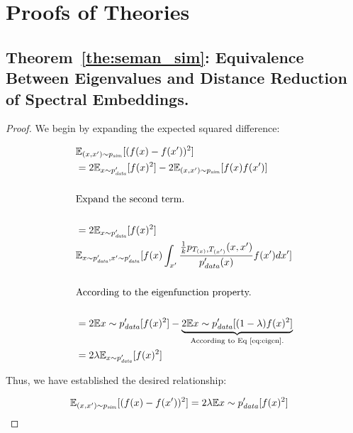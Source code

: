 \section{Proofs of Theories}

\subsection{\textbf{Theorem}~\ref{the:seman_sim}: Equivalence Between Eigenvalues and Distance Reduction of Spectral Embeddings.}\label{proof:eq}


\begin{proof}
    
We begin by expanding the expected squared difference:

\begin{equation}
\begin{aligned}
& \mathbb{E}_{(x, x^\prime)\sim p_{\text{\textit{sim}}}} [(f(x) - f(x^\prime))^2] \\
& = 2\mathbb{E}_{x \sim p_{\text{\textit{data}}}^\prime}[f(x)^2] - 2\mathbb{E}_{(x, x^\prime)\sim p_{\text{\textit{sim}}}}[f(x)f(x^\prime)] \\
&  \\ & \text{Expand the second term.} \\ \\
& =  2\mathbb{E}_{x \sim p_{\text{\textit{data}}}^\prime}[f(x)^2] \\ 
& \mathbb{E}_{x \sim p^\prime_{\text{\textit{data}}}, x^\prime \sim p_{\text{\textit{data}}}^\prime}[f(x) \int_{x^\prime} \frac { \frac 1 k p_{T_{(x)}, T_{(x^\prime)}}(x, x^\prime)} {p_{\text{\textit{data}}}^\prime(x)} f(x^\prime) dx^\prime] \\
&  \\ & \text{According to the eigenfunction property.} \\ \\
& = 2\mathbb{E}{x \sim p_{\text{\textit{data}}}^\prime}[f(x)^2] - \underbrace{2\mathbb{E}{x \sim p_{\text{\textit{data}}}^\prime}[(1-\lambda) f(x)^2]}_{\text{According to Eq~\ref{eq:eigen}.}} \\
& = 2\lambda\mathbb{E}_{x \sim p_{\text{\textit{data}}}^\prime}[f(x)^2]
\end{aligned}
\end{equation}

Thus, we have established the desired relationship:

\begin{equation}
\begin{aligned}
\mathbb{E}_{(x, x^\prime)\sim p_{\text{\textit{sim}}}} [(f(x) - f(x^\prime))^2]
& = 2\lambda\mathbb{E}{x \sim p_{\text{\textit{data}}}^\prime}[f(x)^2]
\end{aligned}
\end{equation}


\end{proof}


